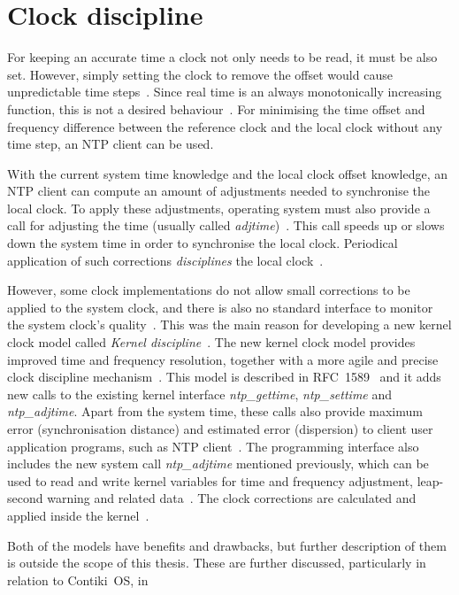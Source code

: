 \section{Clock discipline}\label{sec:system-discipline}
For keeping an accurate time a clock not only needs to be read, it must be also set.
However, simply setting the clock to remove the offset would cause unpredictable time steps~\cite{ntp-faq}.
Since real time is an always monotonically increasing function, this is not a desired behaviour~\cite{ntp-daq}.
For minimising the time offset and frequency difference between
the reference clock and the local clock without any time step,
an NTP client can be used.

With the current system time knowledge and the local clock offset knowledge,
an NTP client can compute an amount of adjustments needed to synchronise the local clock.
To apply these adjustments, operating system must also provide a call
for adjusting the time (usually called {\it{adjtime}})~\cite{nanokernel}.
This call speeds up or slows down the system time in order to synchronise the local clock.
Periodical application of such corrections {\it{disciplines}} the local clock~\cite{ntp-faq}.

However, some clock implementations do not allow small corrections to be applied
to the system clock, and there is also no standard interface to monitor the system clock's quality~\cite{ntp-faq}.
This was the main reason for developing a new kernel clock model called {\it{Kernel discipline}}~\cite{nanokernel}.
The new kernel clock model provides improved time and frequency
resolution, together with a more agile and precise clock discipline mechanism~\cite{nanokernel}.
This model is described in RFC~1589~\cite{rfc1589} and it adds new calls to the existing kernel interface
{\it{ntp\_gettime}}, {\it{ntp\_settime}} and {\it{ntp\_adjtime}}.
Apart from the system time, these calls also provide maximum error (synchronisation distance)
and estimated error (dispersion) to client user application programs, such as NTP client~\cite{rfc1589}.
The programming interface also includes the new
system call {\it{ntp\_adjtime}} mentioned previously, which can be used
to read and write kernel variables for time and frequency
adjustment, leap-second warning and related data~\cite{rfc1589}.
The clock corrections are calculated and applied inside the kernel~\cite{ntp-faq}.

Both of the models have benefits and drawbacks,
but further description of them is outside the scope of this thesis.
These are further discussed, particularly in relation to Contiki~OS, in %
